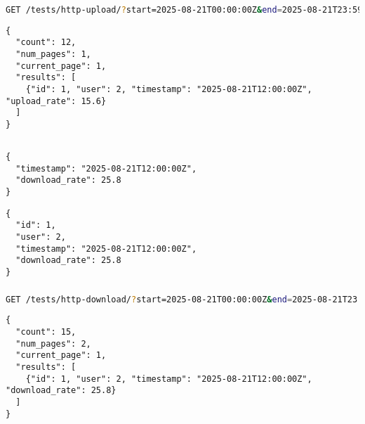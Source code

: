 \documentclass{report}
\begin{document}
\subsubsection{}
\begin{latin}
\begin{lstlisting}[style=jsonstyle, language=bash]
GET /tests/http-upload/?start=2025-08-21T00:00:00Z&end=2025-08-21T23:59:59Z
\end{lstlisting}
\end{latin}
\textbf{}
\begin{latin}
\begin{lstlisting}[style=jsonstyle]
{
  "count": 12,
  "num_pages": 1,
  "current_page": 1,
  "results": [
    {"id": 1, "user": 2, "timestamp": "2025-08-21T12:00:00Z", "upload_rate": 15.6}
  ]
}
\end{lstlisting}
\end{latin}

\subsection{}
\subsubsection{}
\begin{latin}
\begin{lstlisting}[style=jsonstyle]
{
  "timestamp": "2025-08-21T12:00:00Z",
  "download_rate": 25.8
}
\end{lstlisting}
\end{latin}
\textbf{}
\begin{latin}
\begin{lstlisting}[style=jsonstyle]
{
  "id": 1,
  "user": 2,
  "timestamp": "2025-08-21T12:00:00Z",
  "download_rate": 25.8
}
\end{lstlisting}
\end{latin}

\subsubsection{}
\begin{latin}
\begin{lstlisting}[style=jsonstyle, language=bash]
GET /tests/http-download/?start=2025-08-21T00:00:00Z&end=2025-08-21T23:59:59Z
\end{lstlisting}
\end{latin}
\textbf{}
\begin{latin}
\begin{lstlisting}[style=jsonstyle]
{
  "count": 15,
  "num_pages": 2,
  "current_page": 1,
  "results": [
    {"id": 1, "user": 2, "timestamp": "2025-08-21T12:00:00Z", "download_rate": 25.8}
  ]
}
\end{lstlisting}
\end{latin}
\end{document}
